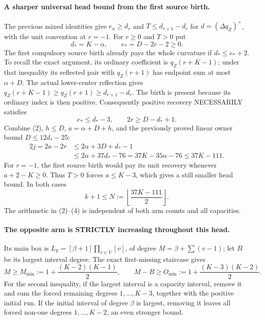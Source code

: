 \paragraph{A sharper universal head bound from the first source birth.}
The previous mixed identities give $e_n\ge d_r$ and $T\le d_{r+1}-d_r$
for $d=(\Delta q_Z)^+$, with the unit convention at $r=-1$.
For $r\ge0$ and $T>0$ put
\[
 d_*=K-\alpha,\qquad e_*=D-2r-2\ge0.
\]
The first compulsory source birth already pays the whole curvature
if $d_*\le e_*+2$.  To recall the exact argument, its ordinary
coefficient is $q_Z(r+K-1)$; under that inequality its reflected
pair with $q_Z(r+1)$ has endpoint sum at most $\alpha+D$.
The actual lower-center reflection gives
$q_Z(r+K-1)\ge q_Z(r+1)\ge d_{r+1}-d_r$.
The birth is present because its ordinary index is then positive.
Consequently positive recovery NECESSARILY satisfies
\[
                 e_*\le d_*-3,\qquad
                         2r\ge D-d_*+1.              \tag{2}
\]
Combine (2), $h\le D$, $a=\alpha+D+h$, and the previously proved
linear owner bound $D\le12d_*-25$:
\[
 \begin{split}
 2j=2a-2r
 &\le2\alpha+3D+d_*-1\\
 &\le2\alpha+37d_*-76
   =37K-35\alpha-76\le37K-111.
 \end{split}                                           \tag{3}
\]
For $r=-1$, the first source birth would pay its unit recovery
whenever $a+2-K\ge0$.  Thus $T>0$ forces $a\le K-3$, which
gives a still smaller head bound.  In both cases
\[
            k+1\le N:=\left\lfloor\frac{37K-111}{2}\right\rfloor.
                                                               \tag{4}
\]
The arithmetic in (2)--(4) is independent of both arm counts and
all capacities.

\paragraph{The opposite arm is STRICTLY increasing throughout this head.}
Its main box is $L_Y=[\beta+1]\prod_{v\in V}[v]$, of degree
$M=\beta+\sum(v-1)$; let $B$ be its largest interval degree.
The exact first-missing staircase gives
\[
 M\ge M_{\min}:=1+\frac{(K-2)(K-1)}2,\qquad
 M-B\ge O_{\min}:=1+\frac{(K-3)(K-2)}2.              \tag{5}
\]
For the second inequality, if the largest interval is a capacity
interval, remove it and sum the forced remaining degrees
$1,\ldots,K-3$, together with the positive initial run.
If the initial interval of degree $\beta$ is largest, removing it
leaves all forced non-one degrees $1,\ldots,K-2$, an even stronger bound.

